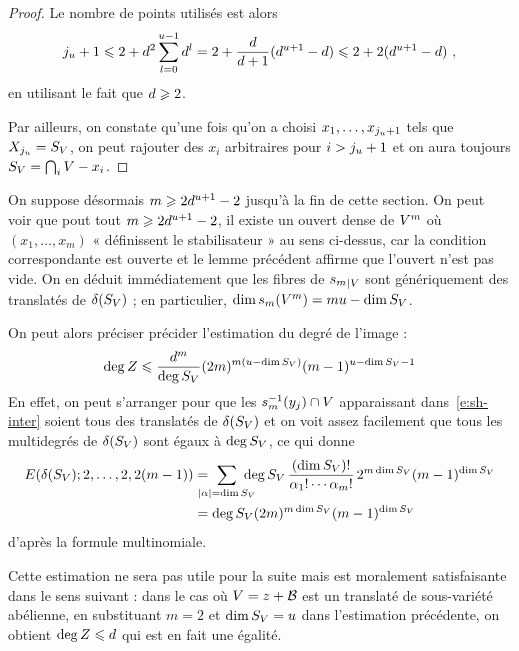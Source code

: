 \begin{proof}
  Le nombre de points utilisés est alors
  \begin{equation}
    j_u + 1
    \leqslant
    2 + d^2 \sum_{l=0}^{u-1} d^l
    =
    2 + \frac{d}{d+1} (d^{u+1} - d)
    \leqslant
    2 + 2 (d^{u+1} - d)
    \text{ ,}
  \end{equation}
  en utilisant le fait que \( d \geqslant 2 \).

  Par ailleurs, on constate qu'une fois qu'on a choisi \( x_1, \dots,
    x_{j_u+1} \) tels que \( X_{j_u} = S_V \), on peut rajouter
  des \( x_i \) arbitraires pour \( i > j_u + 1 \) et on aura toujours \(
    S_V = \bigcap_i V - x_i \).
\end{proof}

On suppose désormais \( m \geqslant 2 d^{u+1} - 2 \) jusqu'à la fin de cette
section.  On peut voir que pout tout \( m \geqslant 2 d^{u+1} - 2
\), il existe un ouvert dense de \( V^m \) où \( (x_1, \dots, x_m) \) «
définissent le stabilisateur » au sens ci-dessus, car la condition
correspondante est ouverte et le lemme précédent affirme que l'ouvert n'est
pas vide. On en déduit immédiatement que les fibres de \( {s_m}_{|V} \)
sont génériquement des translatés de \( \delta(S_V) \) ; en particulier,
\( \dim s_m(V^m) = m u - \dim S_V \).

On peut alors préciser précider l'estimation du degré de l'image :
\begin{equation}
  \deg Z
  \leqslant
  \frac{ d^m }{ \deg S_V }
  (2m)^{m(u-\dim S_V)} (m-1)^{u - \dim S_V - 1}
\end{equation}
En effet, on peut s'arranger pour que les \( s_m^{-1}(y_j) \cap V \)
apparaissant dans~\eqref{e:sh-inter} soient tous des translatés de \(
  \delta(S_V) \) et on voit assez facilement que tous les multidegrés de
\( \delta(S_V) \) sont égaux à \( \deg S_V \), ce qui donne
\begin{align}
  E( \delta(S_\avar); 2, \dots, 2, 2(m-1) )
  & =
  \ \sum_{ \mathclap{\lgr\alpha = \dim S_\avar} } \
  \deg S_\avar
  \, \frac{ (\dim S_\avar)! }{ \alpha_1! \cdots \alpha_m! }
  \, 2^{m\dim S_\avar} (m-1)^{\dim S_\avar}
  \\ & =
  \deg S_\avar
  (2m)^{m\dim S_\avar} (m-1)^{\dim S_\avar}
\end{align}
d'après la formule multinomiale.

Cette estimation ne sera  pas utile pour la suite mais est
moralement satisfaisante dans le sens suivant : dans le cas où \( V = z +
  \mathcal B \) est un translaté de sous-variété abélienne, en substituant \( m = 2
\) et \( \dim S_V = u \) dans l'estimation précédente, on obtient
\( \deg Z \leqslant d \) qui est en fait une égalité.


